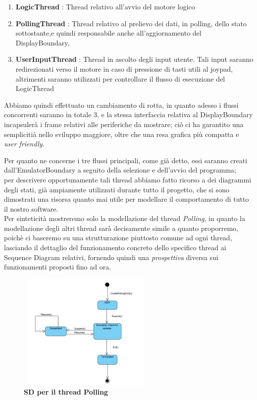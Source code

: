 \documentclass[11pt]{article}
\begin{document}
\begin{enumerate}
\item{
\textbf{LogicThread} : Thread relativo all'avvio del motore logico
}
\item{
\textbf{PollingThread} : Thread relativo al prelievo dei dati, in polling, dello stato sottostante,e quindi responsabile anche all'aggiornamento del DisplayBoundary,
}
\item{
\textbf{UserInputThread} : Thread in ascolto degli input utente. Tali input saranno redirezionati verso il motore in caso di pressione di tasti utili al joypad, altrimenti saranno utilizzati per controllare il flusso di esecuzione del LogicThread
}
\end{enumerate}

Abbiamo quindi effettuato un cambiamento di rotta, in quanto adesso i flussi concorrenti saranno in totale 3, e la stessa interfaccia relativa al DisplayBoundary incapsulerà i frame relativi alle periferiche da mostrare; ciò ci ha garantito una semplicitià nello sviluppo maggiore, oltre che una resa grafica più compatta e \emph{user friendly}.

Per quanto ne concerne i tre flussi principali, come già detto, essi saranno creati dall'EmulatorBoundary a seguito della selezione e dell'avvio del programma;\\
per descrivere opportunamente tali thread abbiamo fatto ricorso a dei diagrammi degli stati, già ampiamente utilizzati durante tutto il progetto, che si sono dimostrati una risorsa quanto mai utile per modellare il comportamento di tutto il nostro software.\\

Per sinteticità mostreremo solo la modellazione del thread \emph{Polling}, in quanto la modellazione degli altri thread sarà decisamente simile a quanto proporremo, poichè ci baseremo su una strutturazione piuttosto comune ad ogni thread, lasciando il dettaglio del funzionamento concreto dello specifico thread ai Sequence Diagram relativi, fornendo quindi una \emph{prospettiva} diversa sui funzionamenti proposti fino ad ora.\\

\begin{figure}[h]
\hspace*{-1.7cm}
\centering
\includegraphics[width=250px, height=215px]{SD_Polling.png}\\
\small\textbf{SD per il thread Polling}
\end{figure}
\end{document}
